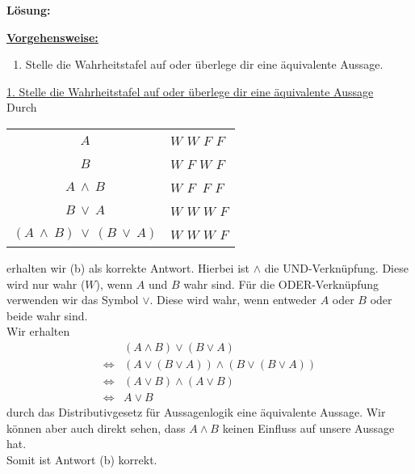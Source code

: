 \textbf{Lösung:}
\begin{mdframed}
\underline{\textbf{Vorgehensweise:}}
\renewcommand{\labelenumi}{\theenumi.}
\begin{enumerate}
\item Stelle die Wahrheitstafel auf oder überlege dir eine äquivalente Aussage.
\end{enumerate}
\end{mdframed}

\underline{1. Stelle die Wahrheitstafel auf oder überlege dir eine äquivalente Aussage}\\
Durch
\begin{center}
\begin{tabular}{cllll}
\hline
\multicolumn{1}{c|}{$A$} & \multicolumn{4}{l}{$W$ $W$ $F$ $F$} \\
\multicolumn{1}{c|}{$B$} & \multicolumn{4}{l}{$W$ $F$ $W$ $F$} \\ \hline
\multicolumn{1}{c|}{$A \ \wedge \ B $} & \multicolumn{4}{l}{$W$ $F \ $  $F$ $F$}  \\ \hline
\multicolumn{1}{c|}{$ B \ \vee \ A$} & \multicolumn{4}{l}{$W$ $W$ $W$ $F$}  \\ \hline
\multicolumn{1}{c|}{$(A \ \wedge \ B) \ \vee \ (B \ \vee \ A)$} & \multicolumn{4}{l}{$W$ $W$ $W$ $F$}  \\ \hline
\end{tabular} 
\end{center}
erhalten wir (b) als korrekte Antwort.
Hierbei ist $\wedge$ die UND-Verknüpfung.
Diese wird nur wahr ($W$), wenn $A$ und $B$ wahr sind.
Für die ODER-Verknüpfung verwenden wir das Symbol $\vee$.
Diese wird wahr, wenn entweder $A$ oder $B$ oder beide wahr sind.
\\
Wir erhalten 
\begin{align*}
&(A  \wedge  B)  \vee  (B  \vee  A)\\
\Leftrightarrow
&(A \vee (B \vee A) ) \wedge (B \vee ( B \vee A))\\
\Leftrightarrow
&(A \vee B)  \wedge (A \vee B)\\
\Leftrightarrow
&A \vee B
\end{align*}
durch das Distributivgesetz für Aussagenlogik eine äquivalente Aussage.
Wir können aber auch direkt sehen, dass $A \wedge B$ keinen Einfluss auf unsere Aussage hat.\\
Somit ist Antwort (b) korrekt.

\newpage



